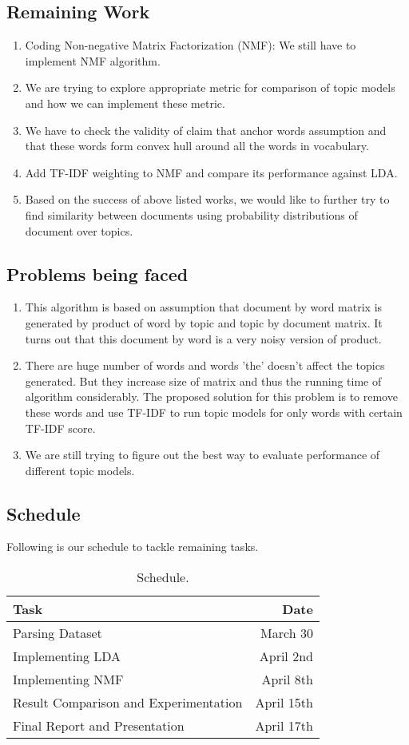 \documentclass[a4paper,11pt]{article}
\begin{document}
\subsection{Remaining Work}
\begin{enumerate}
\item Coding Non-negative Matrix Factorization (NMF): We still have to implement NMF algorithm.
\item We are trying to explore appropriate metric for comparison of topic models and how we can implement these metric.
\item We have to check the validity of claim that anchor words assumption and that these words form convex hull around all the words in vocabulary.
\item Add TF-IDF weighting to NMF and compare its performance against LDA.
\item Based on the success of above listed works, we would like to further try to find similarity between documents using probability distributions of document over topics.
\end{enumerate}


\subsection{Problems being faced}
\begin{enumerate}
\item This algorithm is based on assumption that document by word matrix is generated by product of word by topic and topic by document matrix. It turns out that this document by word is a very noisy version of product. 
\item There are huge number of words and words 'the' doesn't affect the topics generated. But they increase size of matrix and thus the running time of algorithm considerably. The proposed solution for this problem is to remove these words and use TF-IDF to run topic models for only words with certain TF-IDF score.
\item We are still trying to figure out the best way to evaluate performance of different topic models. 
\end{enumerate}


\subsection{Schedule}
Following is our schedule to tackle remaining tasks. 
\begin{table}
\centering
\begin{tabular}[htb]{l|r}
Task & Date\\\hline
Parsing Dataset & March 30 \\
Implementing LDA & April 2nd \\
Implementing NMF & April 8th \\
Result Comparison and Experimentation & April 15th \\
Final Report and Presentation & April 17th
\end{tabular}
\caption{\label{tab:widgets}Schedule.}
\end{table}
\end{document}
